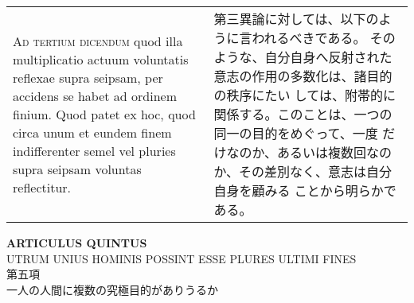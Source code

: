 \documentclass[10pt]{jsarticle} %
\begin{document}
\begin{longtable}{p{21em}p{21em}}
\\


{\scshape Ad tertium dicendum} quod illa
multiplicatio actuum voluntatis reflexae supra seipsam, per accidens se
habet ad ordinem finium. Quod patet ex hoc, quod circa unum et eundem
finem indifferenter semel vel pluries supra seipsam voluntas
reflectitur.

&

第三異論に対しては、以下のように言われるべきである。
そのような、自分自身へ反射された意志の作用の多数化は、諸目的の秩序にたい
 しては、附帯的に関係する。このことは、一つの同一の目的をめぐって、一度
 だけなのか、あるいは複数回なのか、その差別なく、意志は自分自身を顧みる
ことから明らかである。




\end{longtable}
\newpage


\begin{center}
 {\Large {\bf ARTICULUS QUINTUS}}\\
 {\large UTRUM UNIUS HOMINIS POSSINT ESSE PLURES ULTIMI FINES}\\
 {\Large 第五項\\一人の人間に複数の究極目的がありうるか}
\end{center}
\end{document}
